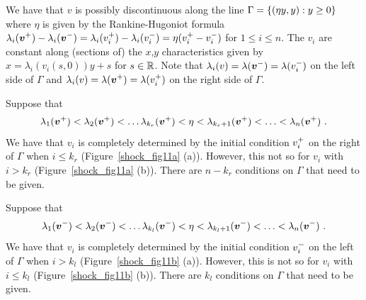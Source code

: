 We have that $v$ is possibly discontinuous along the line
$\displaystyle \Gamma = \left\{ (\eta y,y) : y \geq 0 \right\}$
where $\eta$ is given by the Rankine-Hugoniot formula
$\displaystyle \lambda_i({\bm{v}}^+) - \lambda_i({\bm{v}}^-)
= \lambda_i(v_i^+) - \lambda_i(v_i^-) = \eta (v_i^+ - v_i^-)$
for $1 \leq i \leq n$.  The $v_i$ are constant along (sections
of) the $x$,$y$ characteristics given by 
$x = \lambda_i(v_i(s,0)) y + s$ for $s \in \mathbb{R}$.  Note that
$\displaystyle \lambda_i(v) = \lambda({\bm{v}}^-) = \lambda(v_i^-)$ on
the left side of $\Gamma$ and
$\displaystyle \lambda_i(v) = \lambda({\bm{v}}^+) = \lambda(v_i^+)$ on
the right side of $\Gamma$.

Suppose that
\begin{equation} \label{systConLawEq4}
\lambda_1({\bm{v}}^+) < \lambda_2({\bm{v}}^+) < \ldots
\lambda_{k_r}({\bm{v}}^+) < \eta < \lambda_{k_r+1}({\bm{v}}^+)
< \ldots  < \lambda_n({\bm{v}}^+) \ .
\end{equation}
We have that $v_i$ is completely determined by the initial condition
$\displaystyle v_i^+$ on the right of $\Gamma$ when $i\leq k_r$
(Figure~\ref{shock_fig11a} (a)).  However, this not so for $v_i$ with
$i>k_r$ (Figure~\ref{shock_fig11a} (b)).
There are $n-k_r$ conditions on $\Gamma$ that need to be
given.


Suppose that
\begin{equation} \label{systConLawEq5}
\lambda_1({\bm{v}}^-) < \lambda_2({\bm{v}}^-) < \ldots
\lambda_{k_l}({\bm{v}}^-) < \eta < \lambda_{k_l+1}({\bm{v}}^-)
< \ldots  < \lambda_n({\bm{v}}^-) \ .
\end{equation}
We have that $v_i$ is completely determined by the initial condition
$\displaystyle v_i^-$ on the left of $\Gamma$ when $i > k_l$
(Figure~\ref{shock_fig11b} (a)).  However, this is not so for $v_i$ with
$i\leq k_l$ (Figure~\ref{shock_fig11b} (b)).  There are $k_l$
conditions on $\Gamma$ that need to be given.


